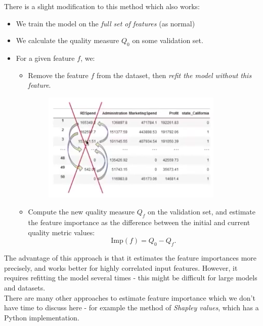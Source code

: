 There is a slight modification to this method which also works:
\begin{itemize}
\item We train the model on the \textit{full set of features} (as normal)
\item We calculate the quality measure $Q_0$ on some validation set.
\item For a given feature $f$, we:
\begin{itemize}
\item Remove the feature $f$ from the dataset, then \textit{refit the model without this feature}. 
\begin{figure}[H]
\centering
\includegraphics[scale=0.4]{featureremoval.png}
\end{figure}
\item Compute the new quality measure $Q_f$ on the validation set, and estimate the feature importance as the difference between the initial and current quality metric values:
\begin{equation*}
\textrm{Imp}(f) = Q_0 - Q_f.
\end{equation*}
\end{itemize}
\end{itemize}
The advantage of this approach is that it estimates the feature importances more precisely, and works better for highly correlated input features. However, it requires refitting the model several times - this might be difficult for large models and datasets.\\

There are many other approaches to estimate feature importance which we don't have time to discuss here - for example the method of \textit{Shapley values}, which has a Python implementation.





\newpage
